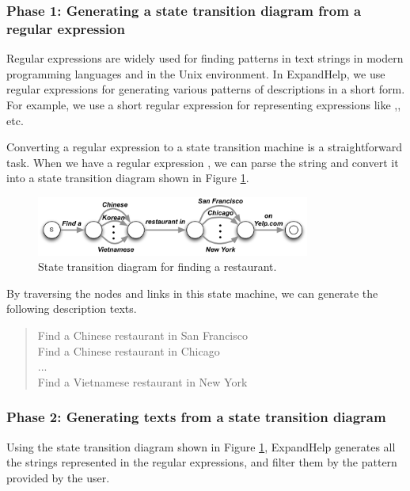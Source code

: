 \documentclass{sigchi}
\def\EH{\textsf{ExpandHelp}}
\begin{document}
\subsubsection{Phase 1: Generating a state transition diagram from a regular expression}

Regular expressions are widely used for finding patterns in text strings
in modern programming languages and in the Unix environment.
In {\EH}, we use regular expressions for
generating various patterns of descriptions in a short form.
For example, we use a short regular expression
for representing expressions like
,, etc.

Converting a regular expression to a state transition machine is a straightforward task.
When we have a regular expression
, 
we can parse the string and convert it into a state transition diagram
shown in Figure \ref{statemachine1}.

\begin{figure}[htb]
\includegraphics[width=90mm,bb=0 0 573 124]{figures/statemachine.pdf}
\caption{State transition diagram for finding a restaurant.}
\label{statemachine1}
\end{figure}

By traversing the nodes and links in this state machine,
we can generate the following description texts.

\begin{quote}
\small
\textsf{Find a Chinese restaurant in San Francisco} \\
\textsf{Find a Chinese restaurant in Chicago} \\
...\\
\textsf{Find a Vietnamese restaurant in New York}\\
\end{quote}

\subsubsection{Phase 2: Generating texts from a state transition diagram}

Using the state transition diagram shown in Figure \ref{statemachine1},
{\EH} generates all the strings represented in the regular expressions,
and filter them by the pattern provided by the user.
\end{document}
